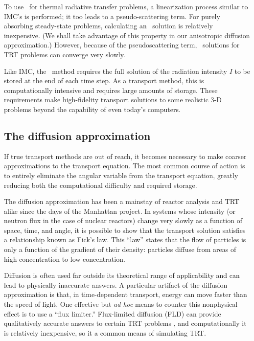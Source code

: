 To use \SN\ for thermal radiative transfer problems, a linearization process
similar to IMC's is performed; it too leads to a pseudo-scattering term.
For purely absorbing steady-state problems, calculating an \SN\ solution is
relatively inexpensive. (We shall take advantage of this property in our
anisotropic diffusion approximation.) However, because of the pseudoscattering
term, \SN\ solutions for TRT problems can converge very slowly.

Like IMC, the \SN\ method requires the full solution of the radiation intensity
$I$ to be stored at the end of each time step. As a transport method, this is
computationally intensive and requires large amounts of storage. These
requirements make high-fidelity transport solutions to some realistic 3-D
problems beyond the capability of even today's computers.

\subsection{The diffusion approximation}
If true transport methods are out of reach, it becomes necessary to make
coarser approximations to the transport equation.
The most common course of action is to entirely eliminate the angular variable
from the transport equation, greatly reducing both the computational difficulty
and required storage.

The diffusion approximation has been a mainstay of reactor analysis and TRT
alike since the days of the Manhattan project. In systems whose intensity (or
neutron flux
in the case of nuclear reactors) change very slowly as a function of space, time, and
angle, it is possible to show \cite{Lar1975,Lar1983a} that the transport
solution satisfies a relationship known as Fick's law. This ``law'' states that
the flow of particles is only a function of the gradient of their density:
particles diffuse from areas of high concentration to low concentration.

Diffusion is often used far outside its theoretical range of applicability and
can lead to physically inaccurate answers. A particular artifact of the
diffusion approximation is that, in time-dependent transport, energy can
move faster than the speed of light. One effective but \emph{ad hoc} means to
counter this nonphysical effect is to use a ``flux limiter.''
Flux-limited diffusion (FLD) can provide qualitatively accurate answers to
certain TRT problems \cite{Ols2000}, and computationally it is relatively
inexpensive, so it a common means of simulating TRT.

